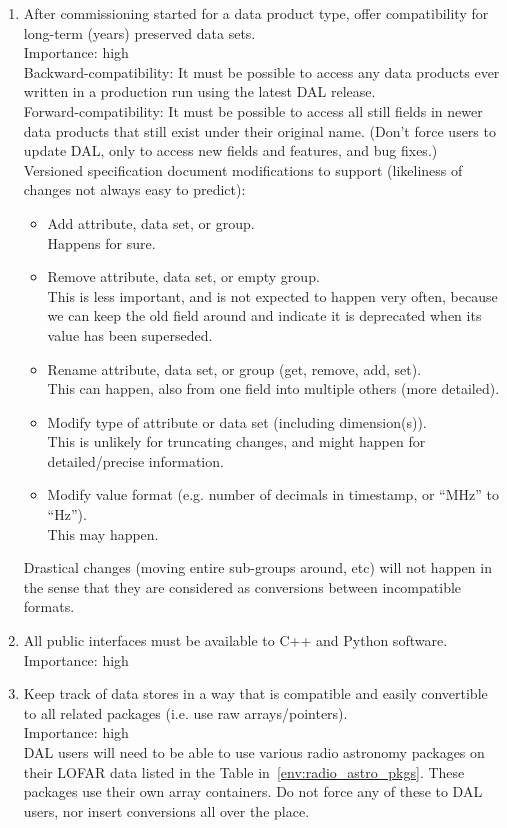 \documentclass[a4paper,11pt]{article}
\begin{document}
\begin{enumerate}[label=\it R.\arabic{*}]
\item \label{req:long-term_compat} After commissioning started for a data product type, offer compatibility for long-term (years) preserved data sets.\\
Importance: high\\
Backward-compatibility: It must be possible to access any data products ever written in a production run using the latest DAL release.\\
Forward-compatibility: It must be possible to access all still fields in newer data products that still exist under their original name. (Don't force users to update DAL, only to access new fields and features, and bug fixes.)\\
Versioned specification document modifications to support (likeliness of changes not always easy to predict):
\begin{itemize}
\itemsep0em
\item Add attribute, data set, or group.\\
Happens for sure.
\item Remove attribute, data set, or empty group.\\
This is less important, and is not expected to happen very often, because we can keep the old field around and indicate it is deprecated when its value has been superseded.
\item Rename attribute, data set, or group (get, remove, add, set).\\
This can happen, also from one field into multiple others (more detailed).
\item Modify type of attribute or data set (including dimension(s)).\\
This is unlikely for truncating changes, and might happen for detailed/precise information.
\item Modify value format (e.g. number of decimals in timestamp, or ``MHz'' to ``Hz'').\\
This may happen.
\end{itemize}
Drastical changes (moving entire sub-groups around, etc) will not happen in the sense that they are considered as conversions between incompatible formats.

\item \label{req:lang_interfaces} All public interfaces must be available to C++ and Python software.\\
Importance: high\\

\item \label{req:data_store_compat} Keep track of data stores in a way that is compatible and easily convertible to all related packages (i.e. use raw arrays/pointers).\\
Importance: high\\
DAL users will need to be able to use various radio astronomy packages on their LOFAR data listed in the Table in~\ref{env:radio_astro_pkgs}.
These packages use their own array containers.
Do not force any of these to DAL users, nor insert conversions all over the place.


\end{enumerate}
\end{document}
